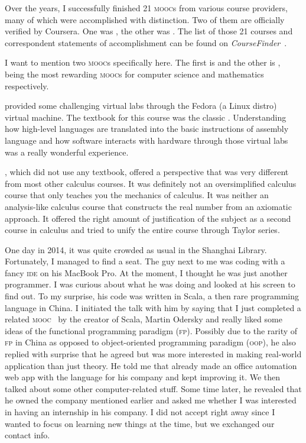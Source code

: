 	Over the years, I successfully finished 21 \textsc{mooc}s from various
	course providers, many of which were accomplished with distinction. Two of them
	are officially verified by Coursera. One was , the other
	was . The list of those 21 courses and correspondent
	statements of accomplishment can be found on
	\textit{CourseFinder}~\cite{accredible}.
	
	I want to mention two \textsc{mooc}s specifically here. The first is
	 and the other is , being the most rewarding
	\textsc{mooc}s for computer science and mathematics respectively.
	
	 provided some challenging virtual labs through the Fedora (a
	Linux distro) virtual machine. The textbook for this course was the classic
	\textcite{CSAPP}. Understanding how high-level languages are translated
	into the basic instructions of assembly language and how software interacts
	with hardware through those virtual labs was a really wonderful experience.

	, which did not use any textbook, offered a perspective that was
	very different from most other calculus courses. It was definitely not an
	oversimplified calculus course that only teaches you the mechanics of calculus.
	It was neither an analysis-like calculus course that constructs the real number
	from an axiomatic approach. It offered the right amount of justification of the
	subject as a second course in calculus and tried to unify the entire course
	through Taylor series.
	
	One day in 2014, it was quite crowded as usual in the Shanghai Library.
	Fortunately, I managed to find a seat. The guy next to me was coding with a
	fancy \textsc{ide} on his MacBook Pro. At the moment, I thought he was just
	another programmer. I was curious about what he was doing and looked at his
	screen to find out. To my surprise, his code was written in Scala, a then rare
	programming language in China. I initiated the talk with him by saying that I
	just completed a related \textsc{mooc}~\cite{FPPS} by the creator of Scala,
	Martin Odersky and really liked some ideas of the functional programming
	paradigm (\textsc{fp}). Possibly due to the rarity of \textsc{fp} in China as
	opposed to object-oriented programming paradigm (\textsc{oop}), he also replied
	with surprise that he agreed but was more interested in making real-world
	application than just theory. He told me that already made an office automation
	web app with the language for his company and kept improving it. We then talked
	about some other computer-related stuff. Some time later, he revealed that he
	owned the company mentioned earlier and asked me whether I was interested in
	having an internship in his company. I did not accept right away since I wanted
	to focus on learning new things at the time, but we exchanged our contact info.
	
